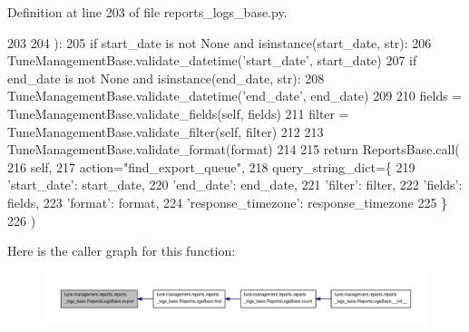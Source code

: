 Definition at line 203 of file reports\-\_\-logs\-\_\-base.\-py.


\begin{DoxyCode}
203 
204     ):
205         \textcolor{keywordflow}{if} start\_date \textcolor{keywordflow}{is} \textcolor{keywordflow}{not} \textcolor{keywordtype}{None} \textcolor{keywordflow}{and} isinstance(start\_date, str):
206             TuneManagementBase.validate\_datetime(\textcolor{stringliteral}{'start\_date'}, start\_date)
207         \textcolor{keywordflow}{if} end\_date \textcolor{keywordflow}{is} \textcolor{keywordflow}{not} \textcolor{keywordtype}{None} \textcolor{keywordflow}{and} isinstance(end\_date, str):
208             TuneManagementBase.validate\_datetime(\textcolor{stringliteral}{'end\_date'}, end\_date)
209 
210         fields = TuneManagementBase.validate\_fields(self, fields)
211         filter = TuneManagementBase.validate\_filter(self, filter)
212 
213         TuneManagementBase.validate\_format(format)
214 
215         \textcolor{keywordflow}{return} ReportsBase.call(
216             self,
217             action=\textcolor{stringliteral}{"find\_export\_queue"},
218             query\_string\_dict=\{
219                 \textcolor{stringliteral}{'start\_date'}: start\_date,
220                 \textcolor{stringliteral}{'end\_date'}: end\_date,
221                 \textcolor{stringliteral}{'filter'}: filter,
222                 \textcolor{stringliteral}{'fields'}: fields,
223                 \textcolor{stringliteral}{'format'}: format,
224                 \textcolor{stringliteral}{'response\_timezone'}: response\_timezone
225             \}
226         )
\end{DoxyCode}


Here is the caller graph for this function\-:
\nopagebreak
\begin{figure}[H]
\begin{center}
\leavevmode
\includegraphics[width=350pt]{classtune_1_1management_1_1reports_1_1reports__logs__base_1_1ReportsLogsBase_adb84c7933f69d2e513859acd5c542a71_icgraph}
\end{center}
\end{figure}


